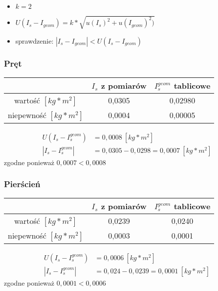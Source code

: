 \noindent
\begin{itemize}
\item $k=2$
\item $U\left(I_s-I_{geom} \right)=k*\sqrt{u(I_s)^2+u(I_{geom})^2)}$
\item sprawdzenie: $\left | I_s - I_{geom} \right | < U(I_s-I_{geom})$
\end{itemize}

\subsubsection{Pręt}
\begin{table}[H]
\centering
\def\arraystretch{1.4}
\begin{tabular}{|c|c|c|}
	\hline
	& $I_s$ z pomiarów & $I_s^{geom}$ tablicowe \\
	\hline
	wartość $[kg*m^2]$ & 0,0305 & 0,02980 \\
	\hline
	niepewność $[kg*m^2]$ & 0,0004 & 0,00005 \\
	\hline
\end{tabular}
\end{table}
\begin{align*}
U\left(I_s-I_s^{geom} \right)&=0,0008~[kg*m^2]\\
\left| I_s-I_s^{geom} \right|&=0,0305-0,0298=0,0007~[kg*m^2]
\end{align*}
zgodne ponieważ $0,0007 < 0,0008$

\subsubsection{Pierścień}
\begin{table}[H]
\centering
\def\arraystretch{1.4}
\begin{tabular}{|c|c|c|}
	\hline
	& $I_s$ z pomiarów & $I_s^{geom}$ tablicowe \\
	\hline
	wartość $[kg*m^2]$ & 0,0239 & 0,0240 \\
	\hline
	niepewność $[kg*m^2]$ & 0,0003 & 0,0001 \\
	\hline
\end{tabular}
\end{table}
\begin{align*}
U\left(I_s-I_s^{geom} \right)&=0,0006~[kg*m^2]\\
\left| I_s-I_s^{geom} \right|&=0,024-0,0239=0,0001~[kg*m^2]
\end{align*}
zgodne ponieważ $0,0001 < 0,0006$

